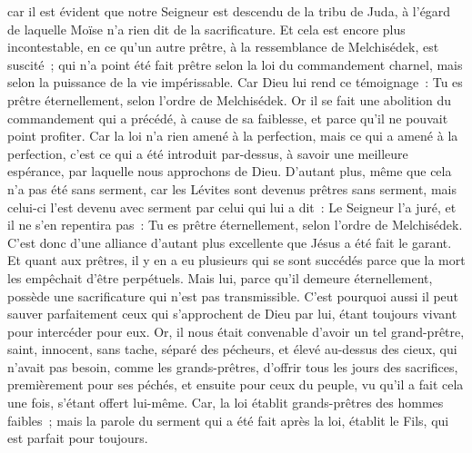 \begin{multicols}{2}
car il est évident que notre Seigneur est descendu de la tribu de Juda, à l'égard de laquelle Moïse n'a rien dit de la sacrificature.
Et cela est encore plus incontestable, en ce qu'un autre prêtre, à la ressemblance de Melchisédek, est suscité~;
qui n'a point été fait prêtre selon la loi du commandement charnel, mais selon la puissance de la vie impérissable.
Car Dieu lui rend ce témoignage~: Tu es prêtre éternellement, selon l'ordre de Melchisédek.
Or il se fait une abolition du commandement qui a précédé, à cause de sa faiblesse, et parce qu'il ne pouvait point profiter.
Car la loi n'a rien amené à la perfection, mais ce qui a amené à la perfection, c'est ce qui a été introduit par-dessus, à savoir une meilleure espérance, par laquelle nous approchons de Dieu.
D'autant plus, même que cela n'a pas été sans serment,
car les Lévites sont devenus prêtres sans serment, mais celui-ci l'est devenu avec serment par celui qui lui a dit~: Le Seigneur l'a juré, et il ne s'en repentira pas~: Tu es prêtre éternellement, selon l'ordre de Melchisédek.
C'est donc d'une alliance d'autant plus excellente que Jésus a été fait le garant.
Et quant aux prêtres, il y en a eu plusieurs qui se sont succédés parce que la mort les empêchait d'être perpétuels.
Mais lui, parce qu'il demeure éternellement, possède une sacrificature qui n'est pas transmissible.
C'est pourquoi aussi il peut sauver parfaitement ceux qui s'approchent de Dieu par lui, étant toujours vivant pour intercéder pour eux.
Or, il nous était convenable d'avoir un tel grand-prêtre, saint, innocent, sans tache, séparé des pécheurs, et élevé au-dessus des cieux,
qui n'avait pas besoin, comme les grands-prêtres, d'offrir tous les jours des sacrifices, premièrement pour ses péchés, et ensuite pour ceux du peuple, vu qu'il a fait cela une fois, s'étant offert lui-même.
Car, la loi établit grands-prêtres des hommes faibles~; mais la parole du serment qui a été fait après la loi, établit le Fils, qui est parfait pour toujours.

\end{multicols}
